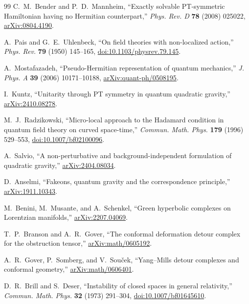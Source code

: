 \documentclass[11pt]{article}
\begin{document}
\begin{thebibliography}{99}
C.~M.~Bender and P.~D.~Mannheim,
``Exactly solvable PT-symmetric Hamiltonian having no Hermitian
counterpart,'' \emph{Phys. Rev. D} \textbf{78} (2008) 025022,
\href{https://arxiv.org/abs/0804.4190}{arXiv:0804.4190}.

A.~Pais and G.~E.~Uhlenbeck,
``On field theories with non-localized action,''
\emph{Phys. Rev.} \textbf{79} (1950) 145--165,
\href{https://doi.org/10.1103/physrev.79.145}{doi:10.1103/physrev.79.145}.

A.~Mostafazadeh,
``Pseudo-Hermitian representation of quantum mechanics,''
\emph{J. Phys. A} \textbf{39} (2006) 10171--10188,
\href{https://arxiv.org/abs/quant-ph/0508195}{arXiv:quant-ph/0508195}.

I.~Kuntz,
``Unitarity through PT symmetry in quantum quadratic gravity,''
\href{https://arxiv.org/abs/2410.08278}{arXiv:2410.08278}.

M.~J.~Radzikowski,
``Micro-local approach to the Hadamard condition in quantum field
theory on curved space-time,'' \emph{Commun. Math. Phys.} \textbf{179}
(1996) 529--553,
\href{https://doi.org/10.1007/bf02100096}{doi:10.1007/bf02100096}.

A.~Salvio,
``A non-perturbative and background-independent formulation of quadratic
gravity,'' \href{https://arxiv.org/abs/2404.08034}{arXiv:2404.08034}.

D.~Anselmi,
``Fakeons, quantum gravity and the correspondence principle,''
\href{https://arxiv.org/abs/1911.10343}{arXiv:1911.10343}.

M.~Benini, M.~Musante, and A.~Schenkel,
``Green hyperbolic complexes on Lorentzian manifolds,''
\href{https://arxiv.org/abs/2207.04069}{arXiv:2207.04069}.

T.~P.~Branson and A.~R.~Gover,
``The conformal deformation detour complex for the obstruction tensor,''
\href{https://arxiv.org/abs/math/0605192}{arXiv:math/0605192}.

A.~R.~Gover, P.~Somberg, and V.~Sou\v cek,
``Yang--Mills detour complexes and conformal geometry,''
\href{https://arxiv.org/abs/math/0606401}{arXiv:math/0606401}.

D.~R.~Brill and S.~Deser,
``Instability of closed spaces in general relativity,''
\emph{Commun. Math. Phys.} \textbf{32} (1973) 291--304,
\href{https://doi.org/10.1007/bf01645610}{doi:10.1007/bf01645610}.


\end{thebibliography}
\end{document}
